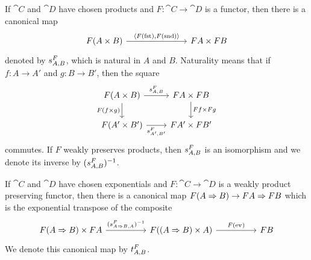 \begin{notn}
If $\cat{C}$ and $\cat{D}$ have chosen products and $F : \cat{C} \to \cat{D}$ is a functor, then there is a canonical map
\[\begin{tikzcd}
	{F(\cprod{A}{B})} &&& {\cprod{FA}{FB}}
	\arrow["{\mpair{F(\mfst)}{F(\msnd)}}", from=1-1, to=1-4]
\end{tikzcd}\]
denoted by $\prodcmp[A,B][F]$, which is natural in $A$ and $B$. Naturality means that if $f : A \to A'$ and $g : B \to B'$, then the square
\[\begin{tikzcd}
	{F(\cprod{A}{B})} & {\cprod{FA}{FB}} \\
	{F(\cprod{A'}{B'})} & {\cprod{FA'}{FB'}}
	\arrow["{\prodcmp[A,B][F]}", from=1-1, to=1-2]
	\arrow["{\prodcmp[A',B'][F]}"', from=2-1, to=2-2]
	\arrow["{F(\cprod{f}{g})}"', from=1-1, to=2-1]
	\arrow["{\cprod{Ff}{Fg}}", from=1-2, to=2-2]
\end{tikzcd}\]
commutes. If $F$ weakly preserves products, then $\prodcmp[A,B][F]$ is an isomorphism and we denote its inverse by $\inv*{\prodcmp[A,B][F]}$.
\end{notn}

\begin{notn}
If $\cat{C}$ and $\cat{D}$ have chosen exponentials and $F : \cat{C} \to \cat{D}$ is a weakly product preserving functor, then there is a canonical map $F(A \Rightarrow B) \to FA \Rightarrow FB$ which is the exponential transpose of the composite
\[\begin{tikzcd}
	{\cprod{F(\cexp{A}{B})}{FA}} && {F(\cprod{(\cexp{A}{B})}{A})} && FB
	\arrow["{F(\mev)}", from=1-3, to=1-5]
	\arrow["{\inv*{\prodcmp[\cexp{A}{B},A][F]}}", from=1-1, to=1-3]
\end{tikzcd}\]
We denote this canonical map by $\expcmp[A,B][F]$.
\end{notn}

